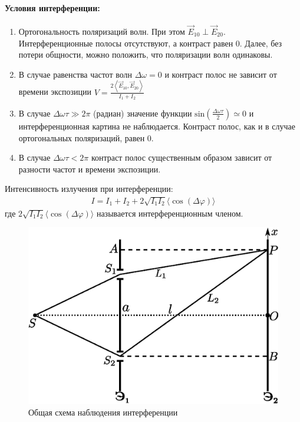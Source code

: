 \documentclass[__minimum__.tex]{subfiles}
\begin{document}
\paragraph{Условия интерференции:}
\begin{enumerate}
    \item
          Ортогональность поляризаций волн.
          При этом $\vec{E}_{10}\perp\vec{E}_{20}$. Интерференционные полосы отсутствуют, а контраст равен $0$. Далее, без потери общности, можно положить, что поляризации волн одинаковы.
    \item
          В случае равенства частот волн ${\mathbf  {}}\Delta \omega = 0$ и контраст полос не зависит от времени экспозиции $V=\frac{2\left<\vec{E}_{10},\vec{E}_{20}\right>}{I_1+I_2}$\\
    \item
          В случае ${\mathbf  {}}\Delta \omega \tau \gg 2\pi$   (радиан) значение функции   ${\displaystyle \mathrm {sin} ({\frac {\Delta \omega \tau }{2}})\simeq 0}$  и интерференционная картина не наблюдается. Контраст полос, как и в случае ортогональных поляризаций, равен $0$.
    \item
          В случае ${\mathbf  {}}\Delta \omega \tau <2\pi$   контраст полос существенным образом зависит от разности частот и времени экспозиции.
\end{enumerate}
Интенсивность излучения при интерференции:
\begin{gather}
    \label{o-02-mainint}
    I = I_1 + I_2 + 2\sqrt{I_1 I_2}\langle\cos(\Delta \varphi)\rangle
\end{gather}
где $2\sqrt{I_1 I_2}\langle\cos(\Delta \varphi)\rangle$ называется интерференционным членом.

\begin{figure}
    \includegraphics[width=1\linewidth]{img/o-02}
    \caption{Общая схема наблюдения интерференции}
    \label{o-02-scheme}
\end{figure}
\end{document}
